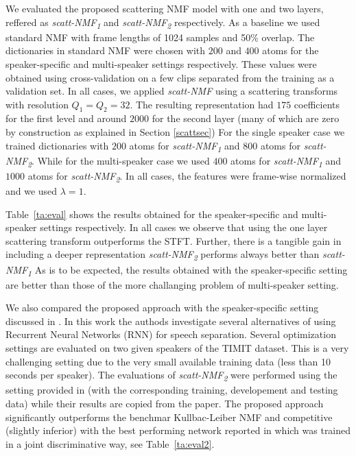  We evaluated the proposed scattering NMF model with one and two layers, reffered
as \emph{scatt-NMF\textsubscript{1}} and \emph{scatt-NMF\textsubscript{2}} respectively. As a baseline we used standard NMF 
with frame lengths of 1024 samples and 50\% overlap. 
%
The dictionaries in standard NMF were chosen with $200$ and $400$ atoms for the speaker-specific and multi-speaker
settings respectively. These values were obtained using cross-validation on a few clips separated from the training as a validation set.
%
In all cases, we applied \emph{scatt-NMF} using a scattering transforms with resolution $Q_1= Q_2 = 32$.
The resulting representation had $175$ coefficients for the first level and around $2000$ for the second layer (many of which are
zero by construction as explained in Section \ref{scattsec})
%
For the single speaker case we trained dictionaries with $200$ atoms for \emph{scatt-NMF\textsubscript{1}}  and $800$ atoms for \emph{scatt-NMF\textsubscript{2}}.
While for the multi-speaker case we used $400$ atoms for \emph{scatt-NMF\textsubscript{1}}  and $1000$ atoms for \emph{scatt-NMF\textsubscript{2}}.
In all cases, the features were frame-wise normalized and we used $\lambda=1$. 
%
%

 Table~\ref{ta:eval} shows the results obtained for the speaker-specific and multi-speaker settings respectively.
In all cases we observe that using the one layer scattering transform outperforms the STFT. 
Further, there is a tangible gain in including a deeper representation \emph{scatt-NMF\textsubscript{2}} performs always better than \emph{scatt-NMF\textsubscript{1}} 
As is to be expected, the results obtained with the speaker-specific setting are better than those of the more challanging problem
of multi-speaker setting. 

We also compared the proposed approach with the speaker-specific setting discussed in \cite{Huang_DNN_Separation_ICASSP2014}. In this work
the authods investigate several alternatives of using Recurrent Neural Networks (RNN) for speech separation.
Several optimization settings are evaluated on two given speakers of the TIMIT dataset. This is a very challenging setting
due to the very small available training data (less than 10 seconds per speaker). The evaluations of \emph{scatt-NMF\textsubscript{2}} were performed using the setting provided in \cite{Huang_DNN_Separation_ICASSP2014} (with the corresponding training, developement and testing data) while their results are copied from the paper.
The proposed approach significantly outperforms the benchmar Kullbac-Leiber NMF and competitive (slightly inferior) with the best performing network
reported in \cite{Huang_DNN_Separation_ICASSP2014} which was trained in a joint discriminative way, see Table~\ref{ta:eval2}.


